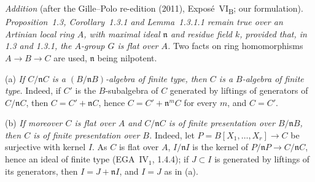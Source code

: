 \medskip\noindent
\emph{Addition} (after the Gille--Polo re-edition (2011), Expos\'e~VI\textsubscript{B}; our
formulation). \emph{Proposition~\textup{1.3}, Corollary~\textup{1.3.1} and Lemma~\textup{1.3.1.1}
remain true over an Artinian local ring \(A\), with maximal ideal \(\mathfrak n\) and residue field
\(k\), provided that, in \textup{1.3} and \textup{1.3.1}, the \(A\)-group \(G\) is flat over \(A\).}
Two facts on ring homomorphisms \(A\to B\to C\) are used, \(\mathfrak n\) being nilpotent.

(a) \emph{If \(C/\mathfrak nC\) is a \((B/\mathfrak nB)\)-algebra of finite type, then \(C\) is a
\(B\)-algebra of finite type.} Indeed, if \(C'\) is the \(B\)-subalgebra of \(C\) generated by
liftings of generators of \(C/\mathfrak nC\), then \(C=C'+\mathfrak nC\), hence
\(C=C'+\mathfrak n^mC\) for every \(m\), and \(C=C'\).

(b) \emph{If moreover \(C\) is flat over \(A\) and \(C/\mathfrak nC\) is of finite presentation over
\(B/\mathfrak nB\), then \(C\) is of finite presentation over \(B\).} Indeed, let
\(P=B[X_1,\ldots,X_r]\to C\) be surjective with kernel \(I\). As \(C\) is flat over \(A\),
\(I/\mathfrak nI\) is the kernel of \(P/\mathfrak nP\to C/\mathfrak nC\), hence an ideal of finite
type (EGA~IV\(_1\), 1.4.4); if \(J\subset I\) is generated by liftings of its generators, then
\(I=J+\mathfrak nI\), and \(I=J\) as in (a).

